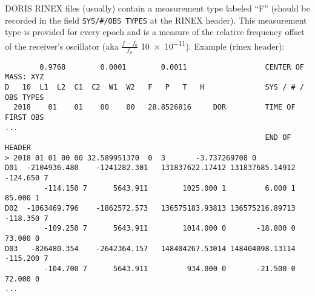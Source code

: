 DORIS RINEX files (usually) contain a measurement type labeled ``F'' (should be 
recorded in the field \verb|SYS/#/OBS TYPES| at the RINEX header). This measurement 
type is provided for every epoch and is a measure of the relative frequency 
offset of the receiver's oscillator (aka \(\frac{f-f_0}{f_0}\) \num{10e-11}).
Example (rinex header):
\begin{verbatim}
        0.9768        0.0001        0.0011                  CENTER OF MASS: XYZ
D   10  L1  L2  C1  C2  W1  W2   F   P   T   H              SYS / # / OBS TYPES
  2018    01    01    00    00   28.8526816     DOR         TIME OF FIRST OBS
...
                                                            END OF HEADER
> 2018 01 01 00 00 32.589951370  0  3       -3.737269708 0
D01  -2104936.480    -1241282.301   131837622.17412 131837685.14912      -124.650 7
         -114.150 7      5643.911        1025.000 1         6.000 1        85.000 1
D02  -1063469.796    -1862572.573   136575183.93813 136575216.89713      -118.350 7
         -109.250 7      5643.911        1014.000 0       -18.800 0        73.000 0
D03   -826480.354    -2642364.157   148404267.53014 148404098.13114      -115.200 7
         -104.700 7      5643.911         934.000 0       -21.500 0        72.000 0
...                                                            
\end{verbatim}

